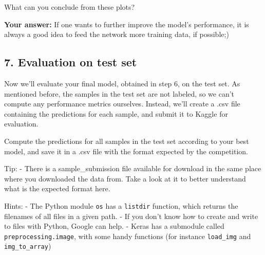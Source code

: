 \documentclass[11pt]{article}
\begin{document}
    What can you conclude from these plots?

    \textbf{Your answer:} If one wants to further improve the model's
performance, it is always a good idea to feed the network more training
data, if possible;)

    \subsection{7. Evaluation on test set}\label{evaluation-on-test-set}

    Now we'll evaluate your final model, obtained in step 6, on the test
set. As mentioned before, the samples in the test set are not labeled,
so we can't compute any performance metrics ourselves. Instead, we'll
create a .csv file containing the predictions for each sample, and
submit it to Kaggle for evaluation.

    Compute the predictions for all samples in the test set according to
your best model, and save it in a .csv file with the format expected by
the competition.

Tip: - There is a sample\_submission file available for download in the
same place where you downloaded the data from. Take a look at it to
better understand what is the expected format here.

Hints: - The Python module \texttt{os} has a \texttt{listdir} function,
which returns the filenames of all files in a given path. - If you don't
know how to create and write to files with Python, Google can help. -
Keras has a submodule called \texttt{preprocessing.image}, with some
handy functions (for instance \texttt{load\_img} and
\texttt{img\_to\_array})
\end{document}
